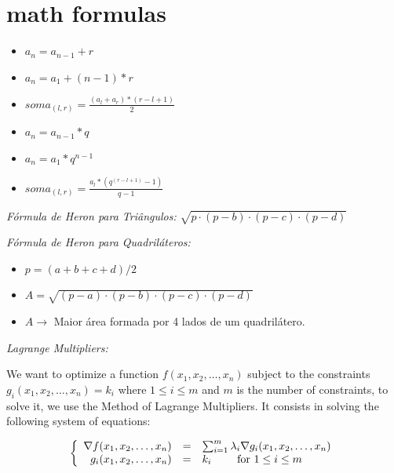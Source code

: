     
     
    \newpage
    \section{math formulas}
    \begin{itemize}
        \item $a_n = a_{n-1} + r$
        \item $a_n = a_1 + (n-1)*r$
        \item \begin{Large}
            $soma_{(l,r)} = \frac{(a_l + a_r) * (r-l+1)}{2}$
        \end{Large}
    \end{itemize}

    \begin{itemize}
    \item $a_n = a_{n-1}*q$
    \item $a_n = a_1*q^{n-1}$
    \item \begin{Large}
            $soma_{(l,r)} = \frac{a_l  * (q^{(r-l+1)}-1)}{q-1}$
        \end{Large}
    \end{itemize}
     
    \textit{Fórmula de Heron para Triângulos:} $\sqrt{p\cdot (p-b) \cdot (p-c) \cdot (p-d)}$
    
    \textit{Fórmula de Heron para Quadriláteros:}
    
    \begin{itemize}
        \item $p = (a+b+c+d)/2$
        \item $A = \sqrt{(p-a) \cdot (p-b) \cdot (p-c) \cdot (p-d)}$
        \item $A \rightarrow$ Maior área formada por 4 lados de um quadrilátero.
    \end{itemize}

    \textit{Lagrange Multipliers:}

    We want to optimize a function $f(x_1,x_2,\dots,x_n)$ subject to the constraints
    $ g_i(x_1,x_2,\dots,x_n) = k_i$ where $1 \le i \le m$ and $m$ is the number of constraints, to solve it, we use the Method of Lagrange Multipliers. It consists in solving the following system of equations:

        \[
            \left\{
            \begin{array}{{rcl}}
               \nabla f(x_1,x_2,\dots,x_n) & = & \sum_{i=1}^{m} \lambda_i \nabla g_i(x_1,x_2,\dots,x_n)  \\
                g_i(x_1,x_2,\dots,x_n)     & = & k_i \ \ \ \ \ \ \ \text{for $1 \le i \le m$}
            \end{array}
            \right.
        \]
    
